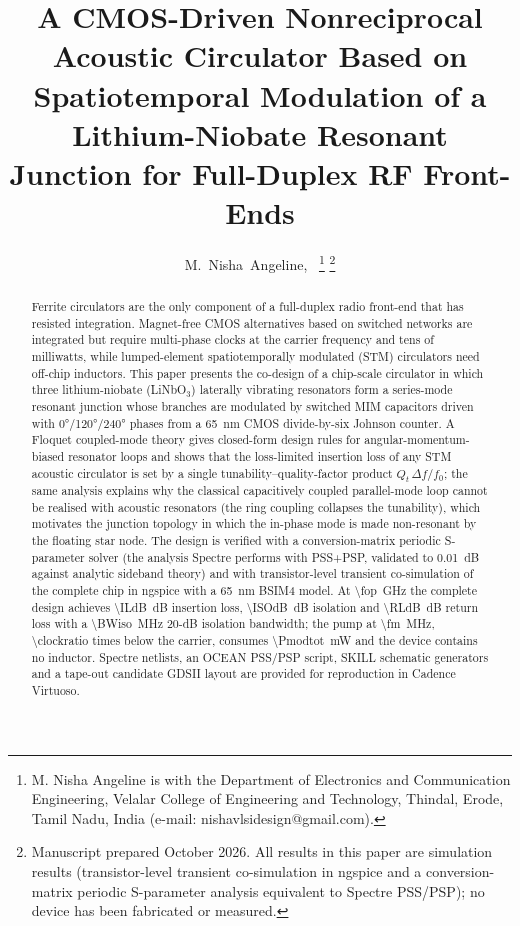 \documentclass[journal]{IEEEtran}
\begin{document}
\title{A CMOS-Driven Nonreciprocal Acoustic Circulator Based on Spatiotemporal Modulation of a Lithium-Niobate Resonant Junction for Full-Duplex RF Front-Ends}

\author{M.~Nisha~Angeline,~%
\thanks{M. Nisha Angeline is with the Department of Electronics and Communication Engineering, Velalar College of Engineering and Technology, Thindal, Erode, Tamil Nadu, India (e-mail: nishavlsidesign@gmail.com).}%
\thanks{Manuscript prepared October 2026. All results in this paper are simulation results (transistor-level transient co-simulation in ngspice and a conversion-matrix periodic S-parameter analysis equivalent to Spectre PSS/PSP); no device has been fabricated or measured.}}


\maketitle

\begin{abstract}
Ferrite circulators are the only component of a full-duplex radio front-end that has resisted integration. Magnet-free CMOS alternatives based on switched networks are integrated but require multi-phase clocks at the carrier frequency and tens of milliwatts, while lumped-element spatiotemporally modulated (STM) circulators need off-chip inductors. This paper presents the co-design of a chip-scale circulator in which three lithium-niobate (LiNbO$_3$) laterally vibrating resonators form a series-mode resonant junction whose branches are modulated by switched MIM capacitors driven with \ang{0}/\ang{120}/\ang{240} phases from a \SI{65}{nm} CMOS divide-by-six Johnson counter. A Floquet coupled-mode theory gives closed-form design rules for angular-momentum-biased resonator loops and shows that the loss-limited insertion loss of any STM acoustic circulator is set by a single tunability--quality-factor product $Q_t\,\Delta f/f_0$; the same analysis explains why the classical capacitively coupled parallel-mode loop cannot be realised with acoustic resonators (the ring coupling collapses the tunability), which motivates the junction topology in which the in-phase mode is made non-resonant by the floating star node. The design is verified with a conversion-matrix periodic S-parameter solver (the analysis Spectre performs with PSS+PSP, validated to \SI{0.01}{dB} against analytic sideband theory) and with transistor-level transient co-simulation of the complete chip in ngspice with a \SI{65}{nm} BSIM4 model. At \SI{\fop}{GHz} the complete design achieves \SI{\ILdB}{dB} insertion loss, \SI{\ISOdB}{dB} isolation and \SI{\RLdB}{dB} return loss with a \SI{\BWiso}{MHz} 20-dB isolation bandwidth; the pump at \SI{\fm}{MHz}, \num{\clockratio} times below the carrier, consumes \SI{\Pmodtot}{mW} and the device contains no inductor.  Spectre netlists, an OCEAN PSS/PSP script, SKILL schematic generators and a tape-out candidate GDSII layout are provided for reproduction in Cadence Virtuoso.
\end{abstract}
\end{document}
